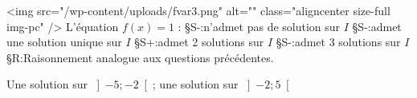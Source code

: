 <img src="/wp-content/uploads/fvar3.png" alt="" class="aligncenter size-full  img-pc" />
L'équation $f\left(x\right)=1$ :
§S-:n'admet pas de solution sur $I$
§S-:admet une solution unique sur $I$
§S+:admet 2 solutions sur $I$
§S-:admet 3 solutions sur $I$
§R:Raisonnement analogue aux questions précédentes.
\par
Une solution sur $\left]-5;-2\right[$; une solution sur $\left]-2;5\right[$
\par

